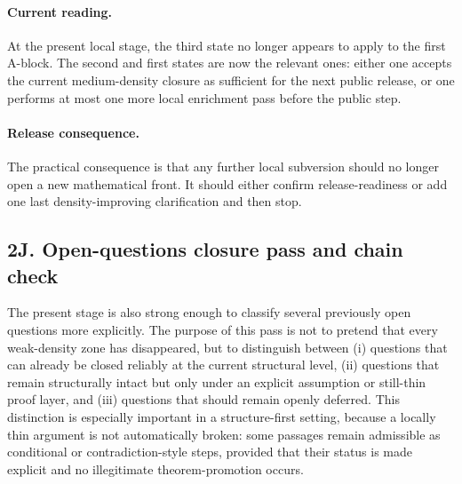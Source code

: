 \paragraph{Current reading.}
At the present local stage, the third state no longer appears to apply to the first A-block. The second and first states are now the relevant ones: either one accepts the current medium-density closure as sufficient for the next public release, or one performs at most one more local enrichment pass before the public step.

\paragraph{Release consequence.}
The practical consequence is that any further local subversion should no longer open a new mathematical front. It should either confirm release-readiness or add one last density-improving clarification and then stop.




\subsection*{2J. Open-questions closure pass and chain check}
The present stage is also strong enough to classify several previously open questions more explicitly. The purpose of this pass is not to pretend that every weak-density zone has disappeared, but to distinguish between (i) questions that can already be closed reliably at the current structural level, (ii) questions that remain structurally intact but only under an explicit assumption or still-thin proof layer, and (iii) questions that should remain openly deferred. This distinction is especially important in a structure-first setting, because a locally thin argument is not automatically broken: some passages remain admissible as conditional or contradiction-style steps, provided that their status is made explicit and no illegitimate theorem-promotion occurs.

